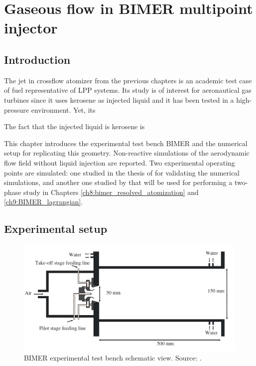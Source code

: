 \chapter{Gaseous flow in BIMER multipoint injector}
	\label{ch9:bimer_test_bench_and_aero}

\section{Introduction}

The jet in crossflow atomizer from the previous chapters is an academic test case of fuel representative of LPP systems. Its study is of interest for aeronautical gas turbines since it uses kerosene as injected liquid and it has been tested in a high-pressure environment. Yet, its

The fact that the injected liquid is kerosene is 

This chapter introduces the experimental test bench BIMER and the numerical setup for replicating this geometry. Non-reactive simulations of the aerodynamic flow field without liquid injection are reported. Two experimental operating points are simulated: one studied in the thesis of  for validating the numerical simulations, and another one studied by  that will be used for performing a two-phase study in Chapters \ref{ch8:bimer_resolved_atomization} and \ref{ch9:BIMER_lagrangian}.



\section{Experimental setup}


\begin{figure}[h!]
	\centering
	\includegraphics[scale=1.0]{./part3_applications/figures_ch7_aero/BIMER_test_bench_expe_maquette}
	\caption{BIMER experimental test bench schematic view. Source: .}
	\label{fig:BIMER_test_bench_expe_maquette}
\end{figure}

